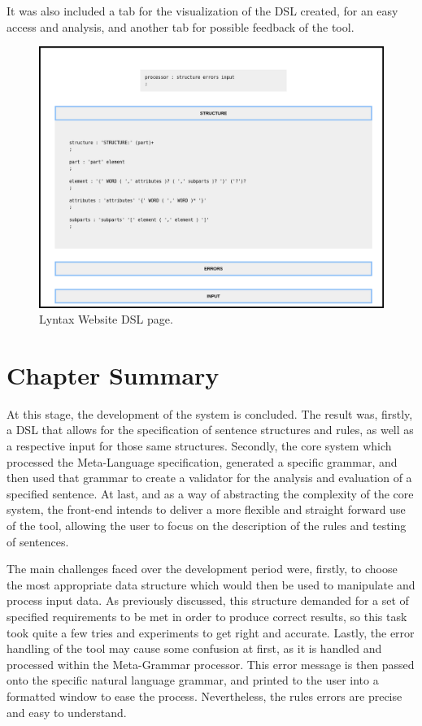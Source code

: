 It was also included a tab for the visualization of the \textsc{DSL} created, for an easy access and analysis, and another tab for possible feedback of the tool.
\begin{figure}[h]
    \centering
    \includegraphics[width=12cm]{images/lyntax-website-dsl.png}
    \caption{Lyntax Website DSL page.}
    \label{fig:lyntaxWebsiteDSL}
\end{figure}

\section{Chapter Summary}

At this stage, the development of the system is concluded.
The result was, firstly, a DSL that allows for the specification of sentence structures and rules, as well as a respective input for those same structures.
Secondly, the core system which processed the Meta-Language specification, generated a specific grammar, 
and then used that grammar to create a validator for the analysis and evaluation of a specified sentence.
At last, and as a way of abstracting the complexity of the core system, 
the front-end intends to deliver a more flexible and straight forward use of the tool,
allowing the user to focus on the description of the rules and testing of sentences.

The main challenges faced over the development period were, firstly,
to choose the most appropriate data structure which would then be used to manipulate and process input data.
As previously discussed, this structure demanded for a set of specified requirements to be met in order to produce correct results, 
so this task took quite a few tries and experiments to get right and accurate.
Lastly, the error handling of the tool may cause some confusion at first, as it is handled and processed within the Meta-Grammar processor.
This error message is then passed onto the specific natural language grammar, and printed to the user into a formatted window to ease the process.
Nevertheless, the rules errors are precise and easy to understand.


